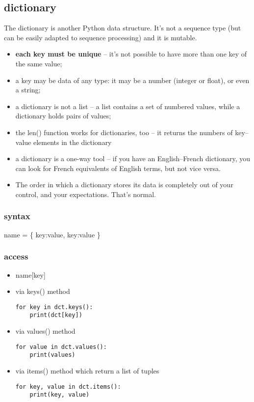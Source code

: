 \documentclass[11pt]{article}
\begin{document}
\subsection{dictionary}
\label{sec:orgcaaeee7}
The dictionary is another Python data structure. It’s not a sequence
type (but can be easily adapted to sequence processing) and it is
mutable.
\begin{itemize}
\item \textbf{each key must be unique} – it’s not possible to have more than one
key of the same value;
\item a key may be data of any type: it may be a number (integer or
float), or even a string;
\item a dictionary is not a list – a list contains a set of numbered
values, while a dictionary holds pairs of values;
\item the len() function works for dictionaries, too – it returns the
numbers of key–value elements in the dictionary
\item a dictionary is a one-way tool – if you have an English–French
dictionary, you can look for French equivalents of English terms,
but not vice versa.
\item The order in which a dictionary stores its data is completely out of
your control, and your expectations. That’s normal.
\end{itemize}

\subsubsection{syntax}
\label{sec:orgaaaf4e8}
name = \{ key:value, key:value \}

\subsubsection{access}
\label{sec:orgca522f1}
\begin{itemize}
\item name[key]

\item via keys() method
\begin{verbatim}
for key in dct.keys():
    print(dct[key])
\end{verbatim}

\item via values() method
\begin{verbatim}
for value in dct.values():
    print(values)
\end{verbatim}

\item via items() method which return a list of tuples
\begin{verbatim}
for key, value in dct.items():
    print(key, value)
\end{verbatim}
\end{itemize}
\end{document}
